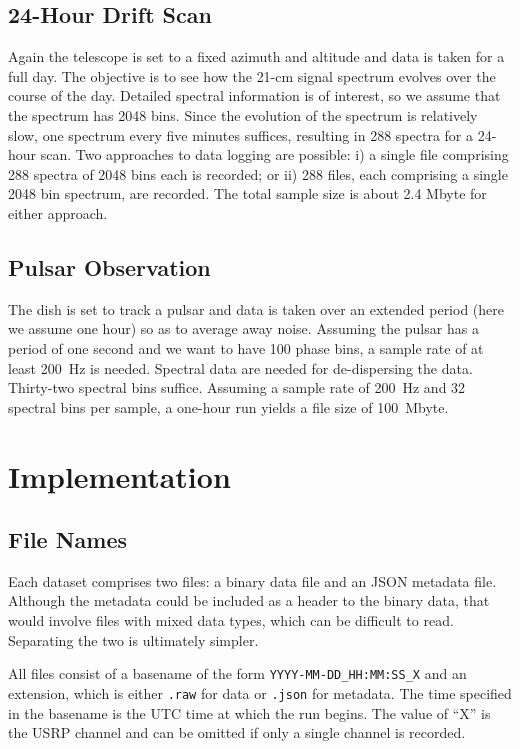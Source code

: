 \documentclass[12pt]{article}
\begin{document}
 \subsection{24-Hour Drift Scan}
 Again the telescope is set to a fixed azimuth and altitude and data is taken for a full day.   The objective is to see how the 21-cm signal spectrum evolves over the course of the day.  Detailed spectral information is of interest, so we assume that the spectrum has 2048 bins.  Since the evolution of the spectrum is relatively slow, one spectrum every five minutes suffices, resulting in 288 spectra for a 24-hour scan.     Two approaches to data logging are possible: i) a single file comprising 288 spectra of 2048 bins each is recorded; or ii) 288 files, each comprising a single 2048 bin spectrum, are recorded.  The total sample size is about 2.4 Mbyte for either approach. 
 
 \subsection{Pulsar Observation}
 The dish is set to track a pulsar and data is taken over an extended period (here we assume one hour) so as to average away noise.    Assuming the pulsar has a period of one second and we want to have 100 phase bins, a sample rate of at least 200~Hz is needed.    Spectral data are needed for de-dispersing the data.    Thirty-two spectral bins suffice.   Assuming a sample rate of 200~Hz and 32 spectral bins per sample, a one-hour run yields a file size of 100~Mbyte.   
 
 
 \section{Implementation}
 
 \subsection{File Names}
 Each dataset comprises two files: a binary data file and an JSON metadata file. 
 Although the metadata could be included as a header to the binary data, that 
 would involve files with mixed data types, which can be difficult to read.   Separating
 the two is ultimately simpler. 
 
 All files consist of a basename of the form {\tt YYYY-MM-DD\_HH:MM:SS\_X} and an extension, 
 which is either {\tt .raw} for data or {\tt .json} for metadata.      The time specified in the 
 basename is the UTC time at which the run begins.   The value of ``X'' is the USRP channel and 
 can be omitted if only a single channel is recorded.    
 
\end{document}
